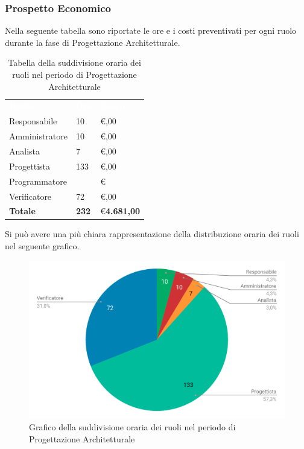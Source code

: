 \subsubsection{Prospetto Economico}
Nella seguente tabella sono riportate le ore e i costi preventivati per ogni ruolo durante la fase di Progettazione Architetturale.


\begin{table}[H]	
	\begin{center}
	    \begin{tabular}{C{4cm}C{1cm}C{3,5cm}}
			\textcolor{white}{\textbf{Ruolo}} & \textcolor{white}{\textbf{Ore}} & \textcolor{white}{\textbf{Costo}}
			\\
			Responsabile & 10 & \euro {},00 \\
			Amministratore & 10 & \euro {},00 \\
			Analista & 7 & \euro {},00 \\
			Progettista & 133 & \euro {},00 \\
			Programmatore &  & \euro \space  \\
			Verificatore & 72 & \euro {},00 \\
			\textbf{Totale} & \textbf{232} & \euro \space  \textbf{4.681,00} \\
		\end{tabular}
	    \caption{Tabella della suddivisione oraria dei ruoli nel periodo di Progettazione Architetturale} \label{tab:tabellaRuoliProgettazione Architetturale} 
	\end{center}
\end{table}


Si può avere una più chiara rappresentazione della distribuzione oraria dei ruoli nel seguente grafico.

\begin{figure}[H]
	\includegraphics[width=1\linewidth]{Preventivo/grafici/PA2.pdf}
	\caption{Grafico della suddivisione oraria dei ruoli nel periodo di Progettazione Architetturale}
\end{figure}

